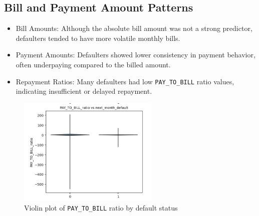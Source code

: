 \documentclass[12pt,a4paper]{article}
\begin{document}
\subsection{Bill and Payment Amount Patterns}
\begin{itemize}
    \item Bill Amounts: Although the absolute bill amount was not a strong predictor, defaulters tended to have more volatile monthly bills.
    \item Payment Amounts: Defaulters showed lower consistency in payment behavior, often underpaying compared to the billed amount.
    \item Repayment Ratios: Many defaulters had low \texttt{PAY\_TO\_BILL} ratio values, indicating insufficient or delayed repayment.
\end{itemize}
\begin{figure}[H]
    \centering
    \includegraphics[width=0.6\textwidth]{figures/5.png}
    \caption{Violin plot of \texttt{PAY\_TO\_BILL} ratio by default status}
\end{figure}
\end{document}
